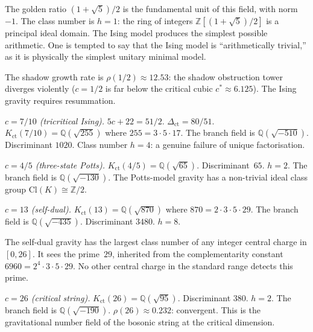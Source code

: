 \documentclass[11pt]{article}
\newcommand{\Z}{\mathbb{Z}}
\newcommand{\Q}{\mathbb{Q}}
\begin{document}
The golden ratio $(1+\sqrt{5})/2$ is the fundamental unit
of this field, with norm $-1$.  The class number is $h = 1$:
the ring of integers $\Z[(1+\sqrt{5})/2]$ is a principal ideal
domain.  The Ising model produces the simplest possible
arithmetic.  One is tempted to say that the Ising model is
``arithmetically trivial,'' as it is physically the simplest
unitary minimal model.

The shadow growth rate is $\rho(1/2) \approx 12.53$: the
shadow obstruction tower diverges violently ($c = 1/2$ is far below
the critical cubic $c^* \approx 6.125$).  The Ising gravity
requires resummation.

\medskip

\noindent\textit{$c = 7/10$ (tricritical Ising).}\enspace
$5c + 22 = 51/2$.  $\Delta_{\mathrm{ct}} = 80/51$.
$K_{\mathrm{ct}}(7/10) = \Q(\sqrt{255})$ where $255 = 3 \cdot 5 \cdot 17$.
The branch field is $\Q(\sqrt{-510})$.
Discriminant $1020$.  Class number $h = 4$: a genuine failure
of unique factorisation.

\medskip

\noindent\textit{$c = 4/5$ (three-state Potts).}\enspace
$K_{\mathrm{ct}}(4/5) = \Q(\sqrt{65})$.  Discriminant~$65$.  $h = 2$.
The branch field is $\Q(\sqrt{-130})$.
The Potts-model gravity has a non-trivial ideal class group
$\mathrm{Cl}(K) \cong \Z/2$.

\medskip

\noindent\textit{$c = 13$ (self-dual).}\enspace
$K_{\mathrm{ct}}(13) = \Q(\sqrt{870})$ where $870 = 2 \cdot 3 \cdot 5 \cdot 29$.
The branch field is $\Q(\sqrt{-435})$.
Discriminant $3480$.  $h = 8$.

The self-dual gravity has the largest class number of any
integer central charge in $[0, 26]$.  It sees the prime~$29$,
inherited from the complementarity constant
$6960 = 2^4 \cdot 3 \cdot 5 \cdot 29$.  No other central
charge in the standard range detects this prime.

\medskip

\noindent\textit{$c = 26$ (critical string).}\enspace
$K_{\mathrm{ct}}(26) = \Q(\sqrt{95})$.  Discriminant $380$.  $h = 2$.
The branch field is $\Q(\sqrt{-190})$.
$\rho(26) \approx 0.232$: convergent.  This is the
gravitational number field of the bosonic string at the
critical dimension.
\end{document}
